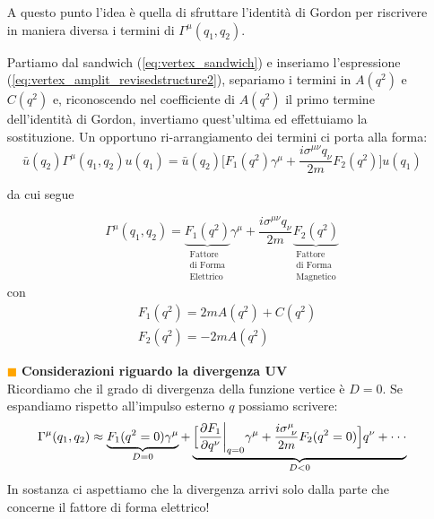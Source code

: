 \documentclass[../main.tex]{subfiles}
\begin{document}
\begin{itemize}
\begin{exercise}
        \end{exercise}

        A questo punto l'idea è quella di sfruttare l'identità di Gordon per riscrivere in maniera diversa i termini di $\Gamma^\mu(q_1,q_2)$.

        Partiamo dal sandwich (\ref{eq:vertex_sandwich}) e inseriamo l'espressione (\ref{eq:vertex_amplit_revisedstructure2}), separiamo i termini in $A(q^2)$ e $C(q^2)$ e, riconoscendo nel coefficiente di $A(q^2)$ il primo termine dell'identità di Gordon, invertiamo quest'ultima ed effettuiamo la sostituzione.
        Un opportuno ri-arrangiamento dei termini ci porta alla forma:
        \[
        \bar u(q_2) \Gamma^\mu(q_1,q_2) u(q_1) = \bar u(q_2) \bigl[ F_1(q^2)\gamma^\mu +\frac{i\sigma^{\mu\nu}q_\nu}{2m} F_2(q^2) \bigr] u(q_1)
        \]

        da cui segue
        
        \begin{equation}
            \boxed{
            \Gamma^\mu(q_1,q_2) = \underbrace{F_1(q^2)}_{\substack{\text{Fattore}\\\text{di Forma}\\ \text{Elettrico}}}\gamma^\mu +\frac{i\sigma^{\mu\nu}q_\nu}{2m} \underbrace{F_2(q^2)}_{\substack{\text{Fattore}\\\text{di Forma}\\ \text{Magnetico}}}
            }
            \label{eq:vertex_formfactors}
        \end{equation}
        con
        \begin{equation}
            \boxed{
            \begin{aligned}
                &F_1(q^2) = 2mA(q^2) + C(q^2) \\
                &F_2(q^2) = -2mA(q^2)
            \end{aligned}
            }
            \label{eq:formfactors}
        \end{equation}
    
    \item[\textcolor{Orange}{$\blacksquare$}] \textbf{Considerazioni riguardo la divergenza UV}\\
        Ricordiamo che il grado di divergenza della funzione vertice è $D=0$. Se espandiamo rispetto all'impulso esterno $q$ possiamo scrivere:
        \[
        \Gamma^\mu(q_1,q_2) \approx \underbrace{F_1(q^2=0)\gamma^\mu}_{D=0} + \underbrace{\Bigl[ \frac{\partial F_1}{\partial q^\nu}\bigg|_{q=0}\gamma^\mu + \frac{i\sigma^{\mu}_{~\nu}}{2m} F_2(q^2=0)\Bigr]q^\nu + \cdot\cdot\cdot}_{D<0} 
        \]
        In sostanza ci aspettiamo che la divergenza arrivi solo dalla parte che concerne il fattore di forma elettrico!
\end{itemize}
\end{document}
